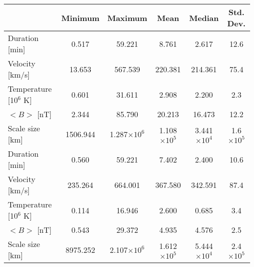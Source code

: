 \begin{tabular}{lccccc}
\hline
       & Minimum & Maximum & Mean & Median & Std. Dev. \\
\hline
Duration [min]         & 0.517    & 59.221             & 8.761              & 2.617     & 12.6 \\
Velocity [km/s]        & 13.653   & 567.539            & 220.381            & 214.361   & 75.4 \\
Temperature [10$^6$ K] & 0.601    & 31.611             & 2.908              & 2.200     & 2.3  \\
$<B>$ [nT]             & 2.344    & 85.790             & 20.213             & 16.473    & 12.2 \\
Scale size [km]        & 1506.944 & 1.287$\times 10^6$ & 1.108$\times 10^5$ & 3.441$\times 10^4$ & 1.6$\times 10^5$ \\

\hline \hline

Duration [min]         & 0.560    & 59.221             & 7.402              & 2.400     & 10.6 \\
Velocity [km/s]        & 235.264  & 664.001            & 367.580            & 342.591   & 87.4 \\
Temperature [10$^6$ K] & 0.114    & 16.946             & 2.600              & 0.685     & 3.4 \\
$<B>$ [nT]             & 0.543    & 29.372             & 4.935              & 4.576     & 2.5 \\
Scale size [km]        & 8975.252 & 2.107$\times 10^6$ & 1.612$\times 10^5$ & 5.444$\times 10^4$ & 2.4$\times 10^5$ \\

\hline
\end{tabular}
